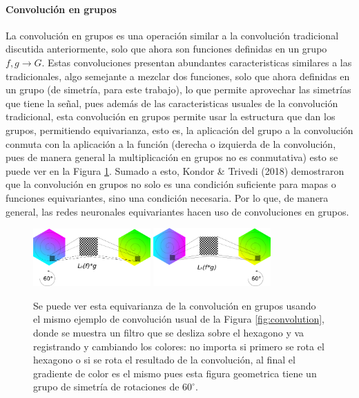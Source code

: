 \documentclass[12pt,letterpaper,final, openany]{scrbook}
\begin{document}
\paragraph{Convolución en grupos}
La convolución en grupos es una operación similar a la convolución tradicional discutida anteriormente, solo que ahora son funciones definidas en un grupo $f,g \rightarrow G$. Estas convoluciones presentan abundantes caracteristicas similares a las tradicionales, algo semejante a mezclar dos funciones, solo que ahora definidas en un grupo (de simetría, para este trabajo), lo que permite aprovechar las simetrías que tiene la señal, pues además de las caracteristicas usuales de la convolución tradicional, esta convolución en grupos permite usar la estructura que dan los grupos, permitiendo equivarianza, esto es, la aplicación del grupo a la convolución conmuta con la aplicación a la función (derecha o izquierda de la convolución, pues de manera general la multiplicación en grupos no es conmutativa) esto se puede ver en la Figura \ref{fig:conv_equivariant}. Sumado a esto, Kondor \& Trivedi (2018) demostraron que la convolución en grupos no solo es una condición suficiente para mapas o funciones equivariantes, sino una condición necesaria. Por lo que, de manera general, las redes neuronales equivariantes hacen uso de convoluciones en grupos.

\begin{figure}[h!]
    \centering
    \includegraphics[width=0.4\textwidth]{aplicacion_en_f.png}
    \includegraphics[width=0.4\textwidth]{aplicacion_en_fg.png}
    \caption{Se puede ver esta equivarianza de la convolución en grupos usando el mismo ejemplo de convolución usual de la Figura \ref{fig:convolution}, donde se muestra un filtro que se desliza sobre el hexagono y va registrando y cambiando los colores: no importa si primero se rota el hexagono o si se rota el resultado de la convolución, al final el gradiente de color es el mismo pues esta figura geometrica tiene un grupo de simetría de rotaciones de $60^{\circ}$.}
    \label{fig:conv_equivariant}
\end{figure}
\end{document}
